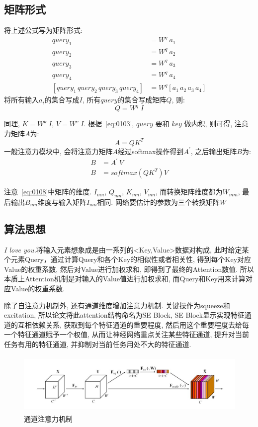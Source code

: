 \subsection{矩阵形式}
将上述公式写为矩阵形式:
\begin{align*}
    query_{1} &= W^{q}\ a_{1}\\
    query_{2} &= W^{q}\ a_{2}\\
    query_{3} &= W^{q}\ a_{3}\\
    query_{4} &= W^{q}\ a_{4}\\
    [query_{1}\, query_{2}\, query_{3}\, query_{4}] & = W^{q} [a_{1}\, a_{2}\, a_{3}\, a_{4}]
\end{align*}
将所有输入$a_{i}$的集合写成$I$, 所有$query$的集合写成矩阵$Q$, 则:
\begin{equation}
    Q = W^{q}\; I
    \label{eq:0106}
\end{equation}

同理, $K=W^{k}\; I$, $V=W^{v}\; I$. 根据~\ref{eq:0103}, $query$ 要和 $key$ 做内积, 则可得, 注意力矩阵$A$为:
\begin{equation}
    A = QK^{T}
    \label{eq:0107}
\end{equation}
一般注意力模块中, 会将注意力矩阵$A$经过softmax操作得到$A^{\prime}$, 之后输出矩阵$B$为:
\begin{align}
    B &= A^{\prime}\ V\\
    B &= softmax(QK^{T})V
    \label{eq:0108}
\end{align}

注意~\ref{eq:0108}中矩阵的维度. $I_{mn}$, $Q_{mn}$, $K_{mn}$, $V_{mn}$, 而转换矩阵维度都为$W_{mm}$, 最后输出$B_{mn}$维度与输入矩阵$I_{mn}$相同. 网络要估计的参数为三个转换矩阵$W$

\subsection{算法思想}
\textit{I love you.}将输入元素想象成是由一系列的<Key,Value>数据对构成, 此时给定某个元素Query，通过计算Query和各个Key的相似性或者相关性, 得到每个Key对应Value的权重系数, 然后对Value进行加权求和, 即得到了最终的Attention数值. 所以本质上Attention机制是对输入的Value值进行加权求和, 而Query和Key用来计算对应Value的权重系数. 

除了自注意力机制外, 还有通道维度增加注意力机制. 关键操作为squeeze和excitation, 所以论文将此attention结构命名为SE Block, SE Block显示实现特征通道的互相依赖关系, 获取到每个特征通道的重要程度, 然后用这个重要程度去给每一个特征通道赋予一个权值, 从而让神经网络重点关注某些特征通道, 提升对当前任务有用的特征通道, 并抑制对当前任务用处不大的特征通道. 
\begin{figure}[!htbp]
    \centering
    \includegraphics[height=8em]{pic/pic0102.jpg}
    \caption{通道注意力机制}
    \label{fig:0102}
\end{figure}

